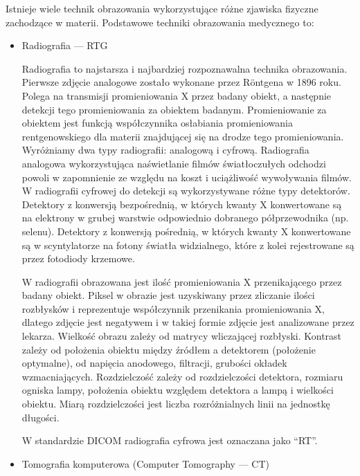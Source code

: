 Istnieje wiele technik obrazowania wykorzystujące różne zjawiska fizyczne zachodzące w materii.
Podstawowe techniki obrazowania medycznego to:
\label{sec:basic-imaging-technics}
\begin{itemize}
    \item Radiografia --- RTG

          Radiografia to najstarsza i najbardziej rozpoznawalna technika obrazowania.
          Pierwsze zdjęcie analogowe zostało wykonane przez Röntgena w 1896 roku.
          Polega na transmisji promieniowania X przez badany obiekt, a następnie detekcji tego promieniowania za obiektem badanym.
          Promieniowanie za obiektem jest funkcją współczynnika osłabiania promieniowania rentgenowskiego dla materii znajdującej się na drodze tego promieniowania.
          Wyróżniamy dwa typy radiografii: analogową i cyfrową.
          Radiografia analogowa wykorzystująca naświetlanie filmów światłoczułych odchodzi powoli w zapomnienie ze względu na koszt i uciążliwość wywoływania filmów.
          W radiografii cyfrowej do detekcji są wykorzystywane różne typy detektorów.
          Detektory z konwersją bezpośrednią, w których kwanty X konwertowane są na elektrony w grubej warstwie odpowiednio dobranego półprzewodnika (np. selenu).
          Detektory z konwersją pośrednią, w których kwanty X konwertowane są w scyntylatorze na fotony światła widzialnego, które z kolei rejestrowane są przez fotodiody krzemowe.

          W radiografii obrazowana jest ilość promieniowania X przenikającego przez badany obiekt.
          Piksel w obrazie jest uzyskiwany przez zliczanie ilości rozbłysków i reprezentuje współczynnik przenikania promieniowania X, dlatego zdjęcie jest negatywem i w takiej formie zdjęcie jest analizowane przez lekarza.
          Wielkość obrazu zależy od matrycy wliczającej rozbłyski.
          Kontrast zależy od położenia obiektu między źródłem a detektorem (położenie optymalne), od napięcia anodowego, filtracji, grubości okładek wzmacniających.
          Rozdzielczość zależy od rozdzielczości detektora, rozmiaru ogniska lampy, położenia obiektu względem detektora a lampą i wielkości obiektu.
          Miarą rozdzielczości jest liczba rozróżnialnych linii na jednostkę długości.

          W standardzie DICOM radiografia cyfrowa jest oznaczana jako \enquote{RT}.

    \item Tomografia komputerowa (Computer Tomography --- CT)


\end{itemize}
